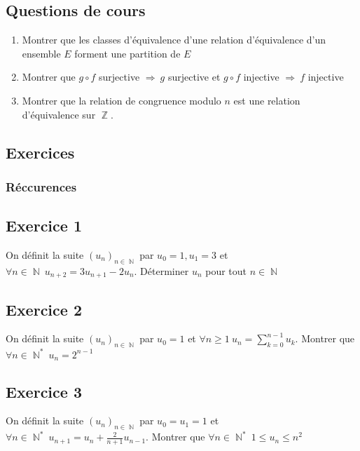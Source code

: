 \documentclass{article}
\DeclareMathOperator{\Z}{\mathbb{Z}}
\DeclareMathOperator{\N}{\mathbb{N}}
\begin{document}
\subsection{Questions de cours}
\setlength{\parindent}{0cm}

\begin{enumerate}
    \item Montrer que les classes d'équivalence d'une relation d'équivalence d'un ensemble $E$ forment une partition de $E$ 
    \item Montrer que $g\circ f$ surjective $\Rightarrow \ g$ surjective et $g\circ f$ injective $\Rightarrow \ f$ injective 
    \item Montrer que la relation de congruence modulo $n$ est une relation d'équivalence sur $\Z$. 
\end{enumerate}

\subsection{Exercices}

\subsubsection{Réccurences}  
\setlength{\parindent}{0cm}

\subsection*{Exercice 1} 

On définit la suite $(u_n)_{n\in \N}$ par $u_0 = 1 , u_1 = 3$ et $\forall n \in \N \ u_{n+2} = 3u_{n+1} - 2u_n$. Déterminer $u_n$ pour tout $n\in \N$ 

\subsection*{Exercice 2} 

On définit la suite $(u_n)_{n\in \N}$ par $u_0 = 1$ et $\forall n \geqslant 1 \ u_n = \displaystyle\sum_{k=0}^{n-1}{u_k}$. Montrer que $\forall n\in \N^* \ u_n = 2^{n-1}$ 

\subsection*{Exercice 3} 

On définit la suite $(u_n)_{n\in \N}$ par $u_0 = u_1 = 1$ et $\forall n \in \N^* \ u_{n+1} = u_n + \displaystyle\frac{2}{n+1}u_{n-1}$. Montrer que $\forall n \in \N^* \ 1 \leqslant u_n \leqslant n^2$ 
\end{document}
